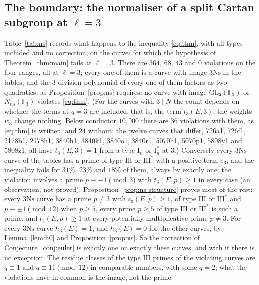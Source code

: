 \documentclass[11pt]{amsart}
\theoremstyle{definition}
\newcommand{\F}{\mathbb{F}}
\newcommand{\Ns}{3\mathrm{Ns}}
\newcommand{\GL}{\mathrm{GL}}
\begin{document}
\subsection{The boundary: the normaliser of a split Cartan subgroup at \texorpdfstring{$\ell=3$}{l=3}}\label{sec:anomaly}
Table~\ref{tab:ns} records what happens to the inequality \eqref{eq:thm}, with all types included and no correction, on the curves for which the hypothesis of Theorem~\ref{thm:main} fails at $\ell=3$. There are $364$, $68$, $43$ and $0$ violations on the four ranges, all at $\ell=3$; every one of them is a curve with image $\Ns$ in the tables, and the $3$-division polynomial of every one of them factors as two quadratics, as Proposition~\ref{prop:ns} requires; no curve with image $\GL_2(\F_3)$ or $N_{ns}(\F_3)$ violates \eqref{eq:thm}. (For the curves with $3\mid N$ the count depends on whether the terms at $q=3$ are included, that is, the term $t_3(E,3)$; the weights $w_3$ change nothing. Below conductor $10{,}000$ there are $36$ violations with them, as \eqref{eq:thm} is written, and $24$ without; the twelve curves that differ, 726a1, 726f1, 2178b1, 2178h1, 3840h1, 3840k1, 3840o1, 3840r1, 5070h1, 5070p1, 5808y1 and 5808z1, all have $t_3(E,3)=1$ from a type $\mathrm{I}_n$ or $\mathrm{I}_n^*$ at $3$.) Conversely every $\Ns$ curve of the tables has a prime of type $\mathrm{III}$ or $\mathrm{III}^*$ with a positive term $e_3$, and the inequality fails for $31\%$, $23\%$ and $18\%$ of them, always by exactly one; the violation involves a prime $p\equiv-1\pmod3$ with $t_3(E,p)\ge1$ in every case (an observation, not proved). Proposition~\ref{prop:ns-structure} proves most of the rest: every $\Ns$ curve has a prime $p\ne3$ with $e_3(E,p)\ge1$, of type $\mathrm{III}$ or $\mathrm{III}^*$ and $p\equiv\pm1\pmod{12}$ when $p\ge5$, every prime $p\ge5$ of type $\mathrm{III}$ or $\mathrm{III}^*$ is such a prime, and $t_3(E,p)\ge1$ at every potentially multiplicative prime $p\ne3$. For every $\Ns$ curve $h_3(E)=1$, and $h_3(E)=0$ for the other curves, by Lemma~\ref{lem:h0} and Proposition~\ref{prop:ns}. So the correction of Conjecture~\ref{conj:euler} is exactly one on exactly these curves, and with it there is no exception. The residue classes of the type $\mathrm{III}$ primes of the violating curves are $q\equiv1$ and $q\equiv11\pmod{12}$ in comparable numbers, with some $q=2$; what the violations have in common is the image, not the prime.
\end{document}
